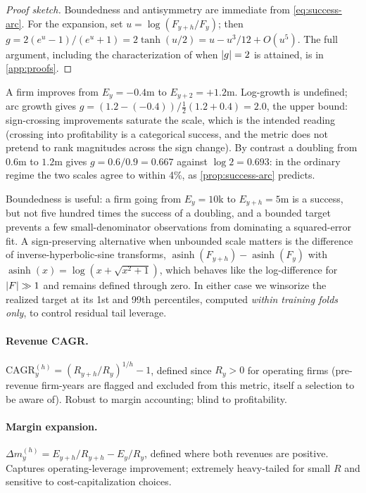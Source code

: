\begin{proof}[Proof sketch]
Boundedness and antisymmetry are immediate from \cref{eq:success-arc}. For the expansion, set $u
= \log(F_{y+h}/F_y)$; then $g = 2(e^{u}-1)/(e^{u}+1) = 2\tanh(u/2) = u - u^3/12 + O(u^5)$. The
full argument, including the characterization of when $\left|g\right|=2$ is attained, is in
\cref{app:proofs}.
\end{proof}

\begin{example}\label{ex:success-arc}
A firm improves from $E_y = -0.4$m to $E_{y+2} = +1.2$m. Log-growth is undefined; arc growth
gives $g = (1.2 - (-0.4)) / \tfrac{1}{2}(1.2 + 0.4) = 2.0$, the upper bound: sign-crossing
improvements saturate the scale, which is the intended reading (crossing into profitability is a
categorical success, and the metric does not pretend to rank magnitudes across the sign change).
By contrast a doubling from $0.6$m to $1.2$m gives $g = 0.6/0.9 = 0.667$ against $\log 2 =
0.693$: in the ordinary regime the two scales agree to within 4\%, as \cref{prop:success-arc}
predicts.
\end{example}

Boundedness is useful: a firm going from $E_y = 10$k to $E_{y+h} = 5$m is a success, but not
five hundred times the success of a doubling, and a bounded target prevents a few
small-denominator observations from dominating a squared-error fit. A
sign-preserving alternative when unbounded scale matters is the difference of
inverse-hyperbolic-sine transforms, $\operatorname{asinh}(F_{y+h}) - \operatorname{asinh}(F_y)$
with $\operatorname{asinh}(x) = \log(x + \sqrt{x^2+1})$, which behaves like the log-difference
for $\left|F\right| \gg 1$ and remains defined through zero. In either case we winsorize the realized
target at its 1st and 99th percentiles, computed \emph{within training folds only}, to control
residual tail leverage.

\paragraph{Revenue CAGR.} $\mathrm{CAGR}^{(h)}_y = (R_{y+h}/R_y)^{1/h} - 1$, defined since $R_y
> 0$ for operating firms (pre-revenue firm-years are flagged and excluded from this metric,
itself a selection to be aware of). Robust to margin accounting; blind to profitability.

\paragraph{Margin expansion.} $\Delta m^{(h)}_y = E_{y+h}/R_{y+h} - E_y/R_y$, defined where both
revenues are positive. Captures operating-leverage improvement; extremely heavy-tailed for small
$R$ and sensitive to cost-capitalization choices.

